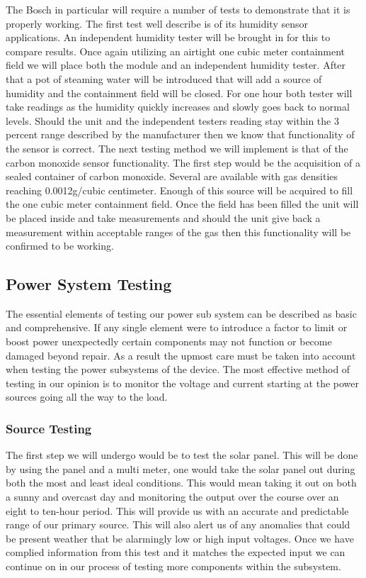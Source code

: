 The Bosch in particular will require a number of tests to demonstrate that it is properly working. The first test well describe is of its humidity sensor applications. An independent humidity tester will be brought in for this to compare results. Once again utilizing an airtight one cubic meter containment field we will place both the module and an independent humidity tester. After that a pot of steaming water will be introduced that will add a source of humidity and the containment field will be closed. For one hour both tester will take readings as the humidity quickly increases and slowly goes back to normal levels. Should the unit and the independent testers reading stay within the 3 percent range described by the manufacturer then we know that functionality of the sensor is correct.
The next testing method we will implement is that of the carbon monoxide sensor functionality. The first step would be the acquisition of a sealed container of carbon monoxide. Several are available with gas densities reaching 0.0012g/cubic centimeter. Enough of this source will be acquired to fill the one cubic meter containment field. Once the field has been filled the unit will be placed inside and take measurements and should the unit give back a measurement within acceptable ranges of the gas then this functionality will be confirmed to be working.

\subsection{Power System Testing}
The essential elements of testing our power sub system can be described as basic and comprehensive. If any single element were to introduce a factor to limit or boost power unexpectedly certain components may not function or become damaged beyond repair. As a result the upmost care must be taken into account when testing the power subsystems of the device. The most effective method of testing in our opinion is to monitor the voltage and current starting at the power sources going all the way to the load. 

\subsubsection{Source Testing}
The first step we will undergo would be to test the solar panel. This will be done by using the panel and a multi meter, one would take the solar panel out during both the most and least ideal conditions. This would mean taking it out on both a sunny and overcast day and monitoring the output over the course over an eight to ten-hour period. This will provide us with an accurate and predictable range of our primary source. This will also alert us of any anomalies that could be present weather that be alarmingly low or high input voltages. Once we have complied information from this test and it matches the expected input we can continue on in our process of testing more components within the subsystem.

